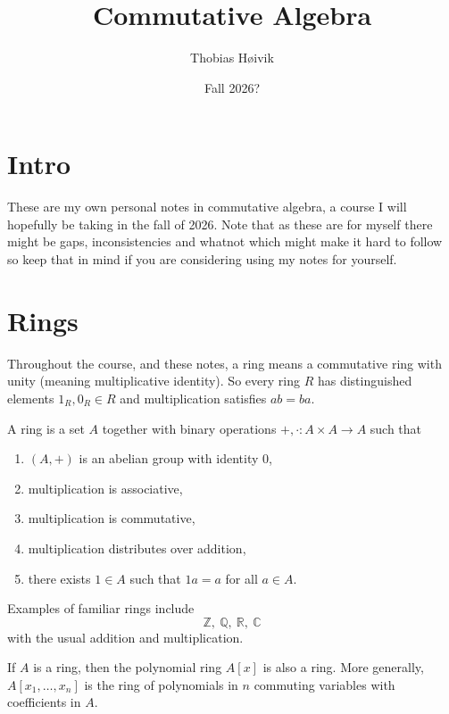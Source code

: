 

\DeclareMathOperator{\Char}{char}
\DeclareMathOperator{\im}{im}


\title{\huge{Commutative Algebra}}
\author{\LARGE{Thobias Høivik}}
\date{Fall 2026?}


\maketitle

\newpage
\tableofcontents

\newpage
\section*{Intro}
These are my own personal notes in commutative algebra, 
a course I will hopefully be taking in the fall of 2026. 
Note that as these are for myself there might be gaps, inconsistencies
and whatnot which might make it hard to follow so 
keep that in mind if you are considering using my notes for 
yourself. 

\section{Rings}
Throughout the course, and these notes, a ring means 
a commutative ring with unity (meaning multiplicative 
identity).
So every ring $R$ has distinguished elements 
$1_R, 0_R \in R$ and multiplication satisfies 
$ab = ba$. 

\begin{defn}
    A ring is a set $A$ together with binary 
    operations $+,\cdot : A \times A \to A$ such that 
    \begin{enumerate}
        \item $(A,+)$ is an abelian group with 
            identity $0$, 
        \item multiplication is associative, 
        \item multiplication is commutative, 
        \item multiplication distributes over addition, 
        \item there exists $1 \in A$ such that 
            $1a = a$ for all $a \in A$. 
    \end{enumerate}
\end{defn}
\begin{ex}
    Examples of familiar rings include 
    \[
        \mathbb Z, \ \mathbb Q, \ \mathbb R, \ \mathbb C
    \]
    with the usual addition and multiplication. 
\end{ex}
If $A$ is a ring, then the polynomial ring $A[x]$ is 
also a ring. More generally, 
$A[x_1,\ldots,x_n]$ is the ring of polynomials in $n$ commuting 
variables with coefficients in $A$. 

